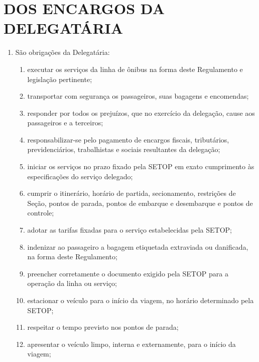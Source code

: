 \chapter{DOS ENCARGOS DA DELEGATÁRIA}

\begin{enumerate}[resume, label=Art. \arabic*]

\item São obrigações da Delegatária:

\begin{enumerate}[label=\roman*.]

\item executar os serviços da linha de ônibus na forma deste Regulamento e legislação pertinente;

\item transportar com segurança os passageiros, suas bagagens e encomendas;

\item responder por todos os prejuízos, que no exercício da delegação, cause aos passageiros e a terceiros;

\item responsabilizar-se pelo pagamento de encargos fiscais, tributários, previdenciários, trabalhistas e sociais resultantes da delegação;

\item iniciar os serviços no prazo fixado pela SETOP em exato cumprimento às especificações do serviço delegado;

\item cumprir o itinerário, horário de partida, secionamento, restrições de Seção, pontos de parada, pontos de embarque e desembarque e pontos de controle;

\item adotar as tarifas fixadas para o serviço estabelecidas pela SETOP;

\item indenizar ao passageiro a bagagem etiquetada extraviada ou danificada, na forma deste Regulamento;

\item preencher corretamente o documento exigido pela SETOP para a operação da linha ou serviço;

\item estacionar o veículo para o início da viagem, no horário determinado pela SETOP;

\item respeitar o tempo previsto nos pontos de parada;

\item apresentar o veículo limpo, interna e externamente, para o início da viagem;


\end{enumerate}
\end{enumerate}
